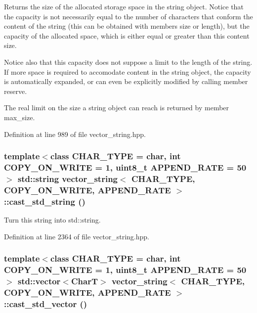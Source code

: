 Returns the size of the allocated storage space in the string object. Notice that the capacity is not necessarily equal to the number of characters that conform the content of the string (this can be obtained with members size or length), but the capacity of the allocated space, which is either equal or greater than this content size.

Notice also that this capacity does not suppose a limit to the length of the string. If more space is required to accomodate content in the string object, the capacity is automatically expanded, or can even be explicitly modified by calling member reserve.

The real limit on the size a string object can reach is returned by member max\_\-size. 

Definition at line 989 of file vector\_\-string.hpp.\hypertarget{classvector__string_5648f7c6fcf1d8b3c89accab7362ba00}{
\subsubsection[{cast\_\-std\_\-string}]{\setlength{\rightskip}{0pt plus 5cm}template$<$class CHAR\_\-TYPE  = char, int COPY\_\-ON\_\-WRITE = 1, uint8\_\-t APPEND\_\-RATE = 50$>$ std::string {\bf vector\_\-string}$<$ CHAR\_\-TYPE, COPY\_\-ON\_\-WRITE, APPEND\_\-RATE $>$::cast\_\-std\_\-string ()}}
\label{classvector__string_5648f7c6fcf1d8b3c89accab7362ba00}


Turn this string into std::string. 

Definition at line 2364 of file vector\_\-string.hpp.\hypertarget{classvector__string_752e8dc22949fe14102e7164f5a970c3}{
\subsubsection[{cast\_\-std\_\-vector}]{\setlength{\rightskip}{0pt plus 5cm}template$<$class CHAR\_\-TYPE  = char, int COPY\_\-ON\_\-WRITE = 1, uint8\_\-t APPEND\_\-RATE = 50$>$ std::vector$<$CharT$>$ {\bf vector\_\-string}$<$ CHAR\_\-TYPE, COPY\_\-ON\_\-WRITE, APPEND\_\-RATE $>$::cast\_\-std\_\-vector ()}}
\label{classvector__string_752e8dc22949fe14102e7164f5a970c3}


